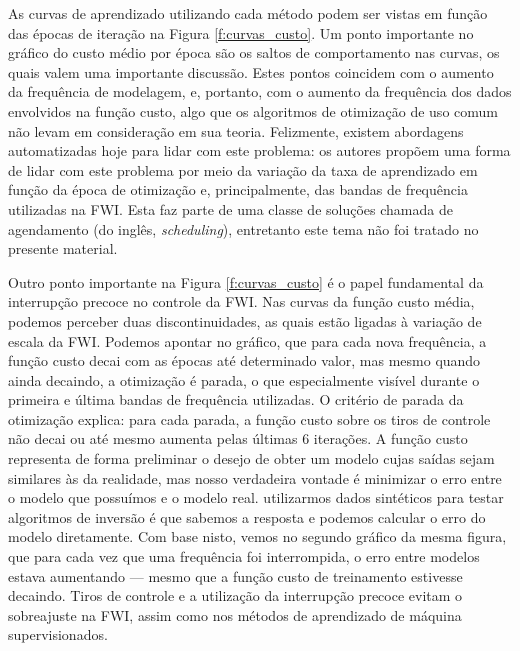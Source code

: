     As curvas de aprendizado utilizando cada método podem ser vistas em função das épocas de iteração na Figura \ref{f:curvas_custo}. Um ponto importante no gráfico do custo médio por época são os saltos de comportamento nas curvas, os quais valem uma importante discussão. Estes pontos coincidem com o aumento da frequência de modelagem, e, portanto, com o aumento da frequência dos dados envolvidos na função custo, algo que os algoritmos de otimização de uso comum não levam em consideração em sua teoria. Felizmente, existem abordagens automatizadas hoje para lidar com este problema: os autores  propõem uma forma de lidar com este problema por meio da variação da taxa de aprendizado em função da época de otimização e, principalmente, das bandas de frequência utilizadas na FWI. Esta faz parte de uma classe de soluções chamada de agendamento (do inglês, \textit{scheduling}), entretanto este tema não foi tratado no presente material.

    Outro ponto importante na Figura \ref{f:curvas_custo} é o papel fundamental da interrupção precoce no controle da FWI. Nas curvas da função custo média, podemos perceber duas discontinuidades, as quais estão ligadas à variação de escala da FWI. Podemos apontar no gráfico, que para cada nova frequência, a função custo decai com as épocas até determinado valor, mas mesmo quando ainda decaindo, a otimização é parada, o que especialmente visível durante o primeira e última bandas de frequência utilizadas. O critério de parada da otimização explica: para cada parada, a função custo sobre os tiros de controle não decai ou até mesmo aumenta pelas últimas 6 iterações. A função custo representa de forma preliminar o desejo de obter um modelo cujas saídas sejam similares às da realidade, mas nosso verdadeira vontade é minimizar o erro entre o modelo que possuímos e o modelo real. \DIFdelbegin {}\DIFdelend \DIFaddbegin {}\DIFaddend utilizarmos dados sintéticos para testar algoritmos de inversão é que sabemos a resposta e podemos calcular o erro do modelo diretamente. Com base nisto, vemos no segundo gráfico da mesma figura, que para cada vez que uma frequência foi interrompida, o erro entre modelos estava aumentando --- mesmo que a função custo de treinamento estivesse decaindo. Tiros de controle e a utilização da interrupção precoce evitam o sobreajuste na FWI, assim como nos métodos de aprendizado de máquina supervisionados.

